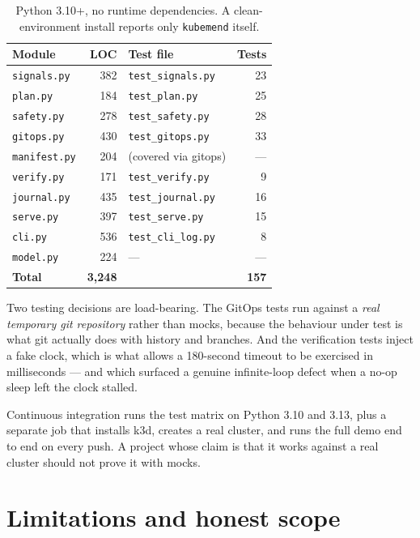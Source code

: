 \documentclass[11pt,a4paper]{article}
\newcommand{\code}[1]{\texttt{\small #1}}
\begin{document}
\begin{table}[h]
\centering
\small
\begin{tabular}{@{}l r l r@{}}
\toprule
\textbf{Module} & \textbf{LOC} & \textbf{Test file} & \textbf{Tests} \\
\midrule
\code{signals.py}  & 382 & \code{test\_signals.py}  & 23 \\
\code{plan.py}     & 184 & \code{test\_plan.py}     & 25 \\
\code{safety.py}   & 278 & \code{test\_safety.py}   & 28 \\
\code{gitops.py}   & 430 & \code{test\_gitops.py}   & 33 \\
\code{manifest.py} & 204 & (covered via gitops)     & --- \\
\code{verify.py}   & 171 & \code{test\_verify.py}   & 9 \\
\code{journal.py}  & 435 & \code{test\_journal.py}  & 16 \\
\code{serve.py}    & 397 & \code{test\_serve.py}    & 15 \\
\code{cli.py}      & 536 & \code{test\_cli\_log.py} & 8 \\
\code{model.py}    & 224 & ---                      & --- \\
\midrule
\textbf{Total}     & \textbf{3{,}248} & & \textbf{157} \\
\bottomrule
\end{tabular}
\caption{Python 3.10+, no runtime dependencies. A clean-environment install
reports only \code{kubemend} itself.}
\end{table}

Two testing decisions are load-bearing. The GitOps tests run against a
\emph{real temporary git repository} rather than mocks, because the behaviour
under test is what git actually does with history and branches. And the
verification tests inject a fake clock, which is what allows a 180-second
timeout to be exercised in milliseconds --- and which surfaced a genuine
infinite-loop defect when a no-op sleep left the clock stalled.

Continuous integration runs the test matrix on Python 3.10 and 3.13, plus a
separate job that installs k3d, creates a real cluster, and runs the full demo
end to end on every push. A project whose claim is that it works against a real
cluster should not prove it with mocks.

\section{Limitations and honest scope}
\label{sec:limits}
\end{document}
